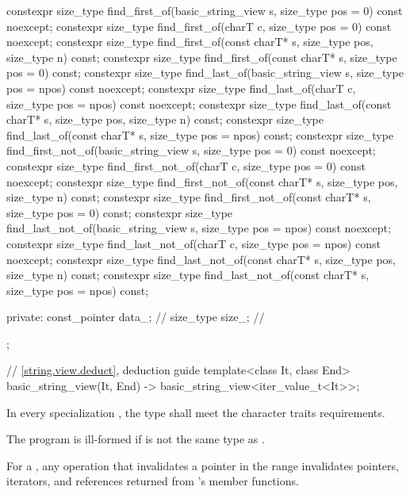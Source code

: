 \begin{codeblock}
{{    constexpr size_type find_first_of(basic_string_view s, size_type pos = 0) const noexcept;
    constexpr size_type find_first_of(charT c, size_type pos = 0) const noexcept;
    constexpr size_type find_first_of(const charT* s, size_type pos, size_type n) const;
    constexpr size_type find_first_of(const charT* s, size_type pos = 0) const;
    constexpr size_type find_last_of(basic_string_view s, size_type pos = npos) const noexcept;
    constexpr size_type find_last_of(charT c, size_type pos = npos) const noexcept;
    constexpr size_type find_last_of(const charT* s, size_type pos, size_type n) const;
    constexpr size_type find_last_of(const charT* s, size_type pos = npos) const;
    constexpr size_type find_first_not_of(basic_string_view s, size_type pos = 0) const noexcept;
    constexpr size_type find_first_not_of(charT c, size_type pos = 0) const noexcept;
    constexpr size_type find_first_not_of(const charT* s, size_type pos,
                                          size_type n) const;
    constexpr size_type find_first_not_of(const charT* s, size_type pos = 0) const;
    constexpr size_type find_last_not_of(basic_string_view s,
                                         size_type pos = npos) const noexcept;
    constexpr size_type find_last_not_of(charT c, size_type pos = npos) const noexcept;
    constexpr size_type find_last_not_of(const charT* s, size_type pos,
                                         size_type n) const;
    constexpr size_type find_last_not_of(const charT* s, size_type pos = npos) const;

  private:
    const_pointer data_;        // \expos
    size_type size_;            // \expos
  };

  // \ref{string.view.deduct}, deduction guide
  template<class It, class End>
    basic_string_view(It, End) -> basic_string_view<iter_value_t<It>>;
}
\end{codeblock}

\pnum
In every specialization , the type  shall meet the character traits requirements.
\begin{note}
The program is ill-formed if  is not the same type as .
\end{note}

\pnum
For a ,
any operation that invalidates a pointer
in the range 
invalidates pointers, iterators, and references
returned from 's member functions.

